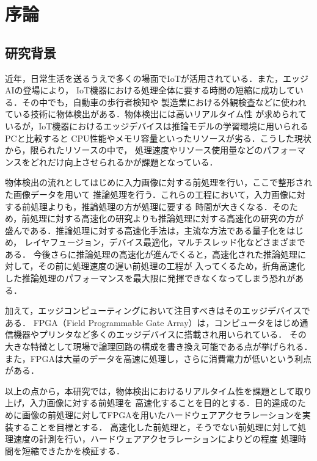 \documentclass[11pt,a4j]{jreport}
\begin{document}
\chapter{序論} %
\setcounter{page}{1}
\section{研究背景}

近年，日常生活を送るうえで多くの場面でIoTが活用されている．また，エッジAIの登場により，
IoT機器における処理全体に要する時間の短縮に成功している．その中でも，自動車の歩行者検知や
製造業における外観検査などに使われている技術に物体検出がある．物体検出には高いリアルタイム性
が求められているが，IoT機器におけるエッジデバイスは推論モデルの学習環境に用いられるPCと比較すると
CPU性能やメモリ容量といったリソースが劣る\cite{EnergyEfficient}．こうした現状から，限られたリソースの中で，
処理速度やリソース使用量などのパフォーマンスをどれだけ向上させられるかが課題となっている．

物体検出の流れとしてはじめに入力画像に対する前処理を行い，ここで整形された画像データを用いて
推論処理を行う．これらの工程において，入力画像に対する前処理よりも，推論処理の方が処理に要する
時間が大きくなる．そのため，前処理に対する高速化の研究よりも推論処理に対する高速化の研究の方が
盛んである．推論処理に対する高速化手法は，主流な方法である量子化をはじめ，
レイヤフュージョン，デバイス最適化，マルチスレッド化などさまざまである\cite{AccelTemp}．
今後さらに推論処理の高速化が進んでくると，高速化された推論処理に対して，その前に処理速度の遅い前処理の工程が
入ってくるため，折角高速化した推論処理のパフォーマンスを最大限に発揮できなくなってしまう恐れがある\cite{hitachi}．

加えて，エッジコンピューティングにおいて注目すべきはそのエッジデバイスである．
FPGA（Field Programmable Gate Array）は，コンピュータをはじめ通信機器やプリンタなど多くのエッジデバイスに搭載され用いられている．
その大きな特徴として現場で論理回路の構成を書き換え可能である点が挙げられる．
また，FPGAは大量のデータを高速に処理し，さらに消費電力が低いという利点がある\cite{merit}．

以上の点から，本研究では，物体検出におけるリアルタイム性を課題として取り上げ，入力画像に対する前処理を
高速化することを目的とする．目的達成のために画像の前処理に対してFPGAを用いたハードウェアアクセラレーションを実装することを目標とする．
高速化した前処理と，そうでない前処理に対して処理速度の計測を行い，ハードウェアアクセラレーションによりどの程度
処理時間を短縮できたかを検証する．
\end{document}
